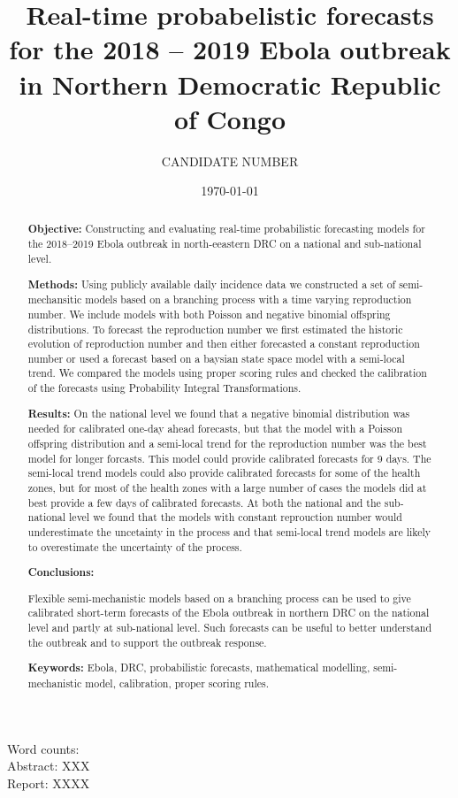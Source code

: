 \documentclass[12pt]{article}
\title{Real-time probabelistic forecasts for the 2018 -- 2019 Ebola outbreak in Northern Democratic Republic of Congo}
\author{
  CANDIDATE NUMBER
}
\date{\today}
\begin{document}
\maketitle


Word counts:\\
Abstract: XXX\\
Report: XXXX

\begin{abstract}
  {\bf Objective:} Constructing and evaluating real-time probabilistic forecasting models for the 2018--2019 Ebola outbreak in north-eeastern DRC on a national and sub-national level.
  
  \medskip
  
  {\bf Methods:} Using publicly available daily incidence data we constructed a set of semi-mechansitic models based on a branching process with a time varying reproduction number. We include models with both Poisson and negative binomial offspring distributions. To forecast the reproduction number we first estimated the historic evolution of reproduction number and then either forecasted a constant reproduction number or used a forecast based on a baysian state space model with a semi-local trend. We compared the models using proper scoring rules and checked the calibration of the forecasts using Probability Integral Transformations. 

  \medksip
  
  {\bf Results:} On the national level we found that a negative binomial distribution was needed for calibrated one-day ahead forecasts, but that the model with a Poisson offspring distribution and a semi-local trend for the reproduction number was the best model for longer forcasts. This model could provide calibrated forecasts for 9 days. The semi-local trend models could also provide calibrated forecasts for some of the health zones, but for most of the health zones with a large number of cases the models did at best provide a few days of calibrated forecasts. At both the national and the sub-national level we found that the models with constant reprouction number would underestimate the uncetainty in the process and that semi-local trend models are likely to overestimate the uncertainty of the process. 

  \medksip
  
  {\bf Conclusions:}

  Flexible semi-mechanistic models based on a branching process can be used to give calibrated short-term forecasts of the Ebola outbreak in northern DRC on the national level and partly at sub-national level. Such forecasts can be useful to better understand the outbreak and to support the outbreak response. 

  \medksip

  {\bf Keywords:} Ebola, DRC, probabilistic forecasts, mathematical modelling, semi-mechanistic model, calibration, proper scoring rules.

\end{abstract}
\end{document}
